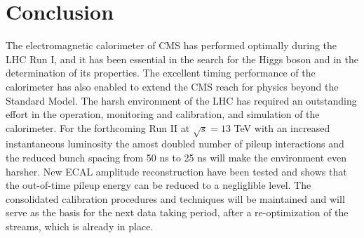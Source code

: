 \documentclass[journal]{IEEEtran}
\begin{document}
\section{Conclusion}
The electromagnetic calorimeter of CMS has performed optimally during the LHC Run I, and it has been essential in the search for the Higgs boson and in the determination of its properties. The excellent timing performance of the calorimeter has also enabled to extend the CMS reach for physics beyond the Standard Model. The harsh environment of the LHC has required an outstanding effort in the operation, monitoring and calibration, and simulation of the calorimeter. For the forthcoming Run II at $\sqrt{s}=13$ TeV with an increased instantaneous luminosity the amost doubled number of pileup interactions and the reduced bunch spacing from 50 ns to 25 ns will make the environment even harsher. New ECAL amplitude reconstruction have been tested and shows that the out-of-time pileup energy can be reduced to a negliglible level. 
The consolidated calibration procedures and techniques will be maintained and will serve as the basis for the next data taking period, after a re-optimization of the streams, which is already in place.


\ifCLASSOPTIONcaptionsoff
  \newpage
\fi




\end{document}
